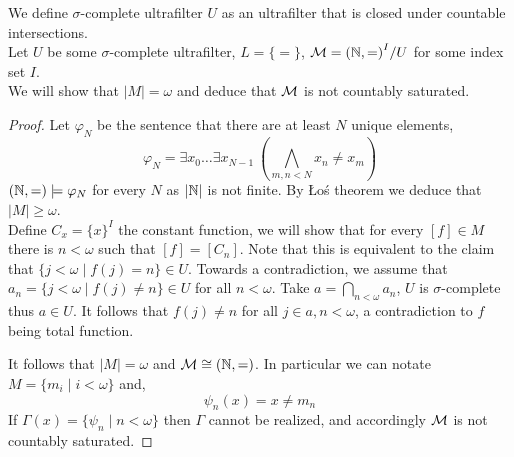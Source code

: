\subquestion{}
We define $\sigma$-complete ultrafilter $U$ as an ultrafilter that is closed under countable intersections. \\
Let $U$ be some $\sigma$-complete ultrafilter, $L = \{ = \}$, $\mathcal{M} = {(\mathbb{N}, =)}^I / U$ for some index set $I$. \\
We will show that $|M| = \omega$ and deduce that $\mathcal{M}$ is not countably saturated.
\begin{proof}
	Let $\varphi_N$ be the sentence that there are at least $N$ unique elements,
	\[
		\varphi_N = \exists x_0 \ldots \exists x_{N - 1}\ \left( \bigwedge_{m, n < N} x_n \ne x_m \right)
	\]
	$(\mathbb{N}, =) \models \varphi_N$ for every $N$ as $|\mathbb{N}|$ is not finite.
	By Łoś theorem we deduce that $|M| \ge \omega$. \\
	Define $C_x = {\{ x \}}^I$ the constant function, we will show that for every $[f] \in M$ there is $n < \omega$ such that $[f] = [C_n]$.
	Note that this is equivalent to the claim that $\{ j < \omega \mid f(j) = n \} \in U$.
	Towards a contradiction, we assume that $a_n = \{ j < \omega \mid f(j) \ne n \} \in U$ for all $n < \omega$.
	Take $a = \bigcap_{n < \omega} a_n$, $U$ is $\sigma$-complete thus $a \in U$.
	It follows that $f(j) \ne n$ for all $j \in a, n < \omega$, a contradiction to $f$ being total function.

	It follows that $|M| = \omega$ and $\mathcal{M} \cong (\mathbb{N}, =)$.
	In particular we can notate $M = \{ m_i \mid i < \omega \}$ and,
	\[
		\psi_n(x)
		= x \ne m_n
	\]
	If $\Gamma(x) = \{ \psi_n \mid n < \omega \}$ then $\Gamma$ cannot be realized, and accordingly $\mathcal{M}$ is not countably saturated.
\end{proof}

